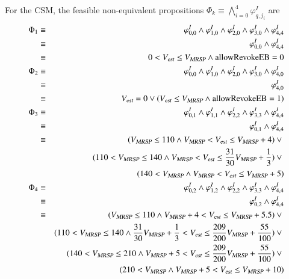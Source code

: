 For the CSM, the feasible non-equivalent propositions $\Phi_k \equiv \bigwedge_{i=0}^4 \varphi_{q,j_i}^I$ are
\begin{eqnarray*}
\Phi_1 & \equiv & \varphi_{0,0}^I \wedge \varphi_{1,0}^I \wedge \varphi_{2,0}^I \wedge \varphi_{3,0}^I \wedge \varphi_{4,4}^I
\\ & \equiv & \varphi_{0,0}^I \wedge \varphi_{4,4}^I
\\ & \equiv & 0 < {V_{\text{\sl est}}} \le {V_{\text{\sl MRSP}}} \wedge \text{allowRevokeEB} = 0
\\
\Phi_2 & \equiv & \varphi_{0,0}^I \wedge \varphi_{1,0}^I \wedge \varphi_{2,0}^I \wedge \varphi_{3,0}^I \wedge \varphi_{4,0}^I
\\ & \equiv & \varphi_{4,0}^I
\\ & \equiv & {V_{\text{\sl est}}} = 0 \vee ({V_{\text{\sl est}}} \le {V_{\text{\sl MRSP}}} \wedge \text{allowRevokeEB} = 1)
\\
\Phi_3 & \equiv & \varphi_{0,1}^I \wedge \varphi_{1,1}^I \wedge  \varphi_{2,2}^I \wedge \varphi_{3,3}^I \wedge \varphi_{4,4}^I 
\\ & \equiv & \varphi_{0,1}^I \wedge \varphi_{4,4}^I
\\ & \equiv & ({V_{\text{\sl MRSP}}} \le 110 \wedge   {V_{\text{\sl MRSP}}} <  {V_{\text{\sl est}}} \le {V_{\text{\sl MRSP}}} +4) \vee {}
\\ & & (110<{V_{\text{\sl MRSP}}}  \le 140  \wedge {V_{\text{\sl MRSP}}} < {V_{\text{\sl est}}} \le \frac{31}{30}{V_{\text{\sl MRSP}}} +\frac{1}{3} )
\vee {}
\\ & & (140<{V_{\text{\sl MRSP}}} \wedge  {V_{\text{\sl MRSP}}} < {V_{\text{\sl est}}} \le {V_{\text{\sl MRSP}}} +5) 
\\
\Phi_4 & \equiv & \varphi_{0,2}^I \wedge \varphi_{1,2}^I \wedge \varphi_{2,2}^I \wedge  \varphi_{3,3}^I \wedge \varphi_{4,4}^I 
\\ & \equiv & \varphi_{0,2}^I \wedge \varphi_{4,4}^I
\\ & \equiv & ({V_{\text{\sl MRSP}}} \le 110 \wedge {V_{\text{\sl MRSP}}} +4 < {V_{\text{\sl est}}} \le {V_{\text{\sl MRSP}}} + 5.5 )
\vee {}
\\ & &  (110 <{V_{\text{\sl MRSP}}}  \le 140 \wedge \frac{31}{30}{V_{\text{\sl MRSP}}} +\frac{1}{3} < {V_{\text{\sl est}}} \le\frac{209}{200}{V_{\text{\sl MRSP}}} +\frac{55}{100}) \vee {}
\\ & & (140 < {V_{\text{\sl MRSP}}} \le 210 \wedge {V_{\text{\sl MRSP}}} +5 < {V_{\text{\sl est}}} \le\frac{209}{200}{V_{\text{\sl MRSP}}} +\frac{55}{100}) \vee {}
\\ & &  (210 < {V_{\text{\sl MRSP}}}  \wedge  {V_{\text{\sl MRSP}}} +5 < {V_{\text{\sl est}}} \le{V_{\text{\sl MRSP}}} + 10)
\end{eqnarray*}

